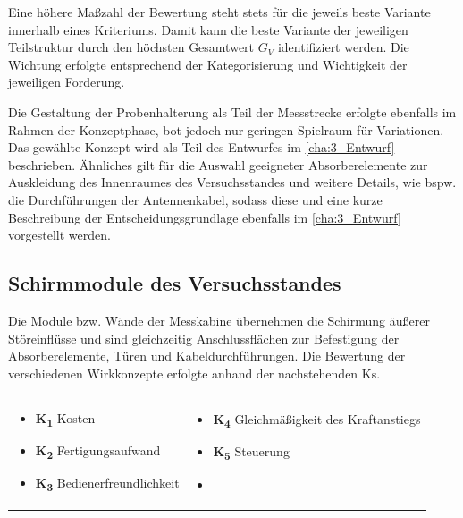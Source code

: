 Eine höhere Maßzahl der Bewertung steht stets für die jeweils beste Variante innerhalb eines Kriteriums. Damit kann die beste Variante der jeweiligen Teilstruktur durch den höchsten Gesamtwert $G_V$ identifiziert werden. Die Wichtung erfolgte entsprechend der Kategorisierung und Wichtigkeit der jeweiligen Forderung.
\par
\vspace{\linespace}
Die Gestaltung der Probenhalterung als Teil der Messstrecke erfolgte ebenfalls im Rahmen der Konzeptphase, bot jedoch nur geringen Spielraum für Variationen. Das gewählte Konzept wird als Teil des Entwurfes im \Abschnitt\ref{cha:3_Entwurf} beschrieben. Ähnliches gilt für die Auswahl geeigneter Absorberelemente zur Auskleidung des Innenraumes des Versuchsstandes und weitere Details, wie bspw. die Durchführungen der Antennenkabel, sodass diese und eine kurze Beschreibung der Entscheidungsgrundlage ebenfalls im \Abschnitt\ref{cha:3_Entwurf} vorgestellt werden.


\subsection{Schirmmodule des Versuchsstandes}\label{cha:3_sub_Schirmmodule_Versuchsstand}

Die Module bzw. Wände der Messkabine übernehmen die Schirmung äußerer Störeinflüsse und sind gleichzeitig Anschlussflächen zur Befestigung der Absorberelemente, Türen und Kabeldurchführungen. Die Bewertung der verschiedenen Wirkkonzepte erfolgte anhand der nachstehenden \acp{K}.

\begin{tabular}{l l}
    \hspace*{1cm} \parbox[c][3cm]{7cm}{
        \begin{itemize}[]
            \item \textbf{K\textsubscript{1}} Kosten
            \item \textbf{K\textsubscript{2}} Fertigungsaufwand
            \item \textbf{K\textsubscript{3}} Bedienerfreundlichkeit
        \end{itemize}
    }&
    \parbox[c]{7cm}{
        \begin{itemize}[]
            \item \textbf{K\textsubscript{4}} Gleichmäßigkeit des Kraftanstiegs
            \item \textbf{K\textsubscript{5}} Steuerung
            \item
        \end{itemize}
    }
\end{tabular}

